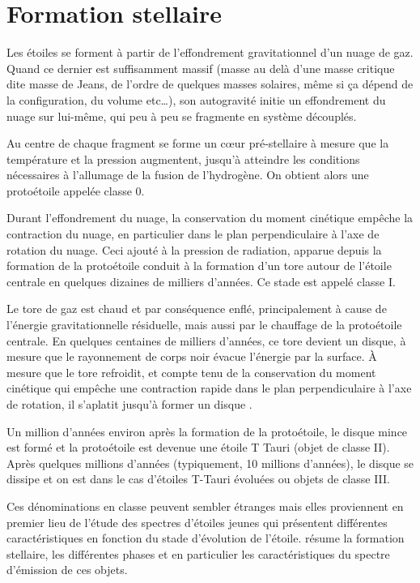 \section{Formation stellaire}
Les étoiles se forment à partir de l'effondrement gravitationnel d'un nuage de gaz. Quand ce dernier est suffisamment massif (masse au delà d'une masse critique dite masse de Jeans, de l'ordre de quelques masses solaires, même si ça dépend de la configuration, du volume etc\dots), son autogravité initie un effondrement du nuage sur lui-même, qui peu à peu se fragmente en système découplés. 

Au centre de chaque fragment se forme un cœur pré-stellaire à mesure que la température et la pression augmentent, jusqu'à atteindre les conditions nécessaires à l'allumage de la fusion de l'hydrogène. On obtient alors une protoétoile appelée \og classe 0\fg. 

Durant l'effondrement du nuage, la conservation du moment cinétique empêche la contraction du nuage, en particulier dans le plan perpendiculaire à l'axe de rotation du nuage. Ceci ajouté à la pression de radiation, apparue depuis la formation de la protoétoile conduit à la formation d'un tore autour de l'étoile centrale en quelques dizaines de milliers d'années. Ce stade est appelé \og classe I\fg.

Le tore de gaz est chaud et par conséquence enflé, principalement à cause de l'énergie gravitationnelle résiduelle, mais aussi par le chauffage de la protoétoile centrale.
En quelques centaines de milliers d'années, ce tore devient un disque, à mesure que le rayonnement de corps noir évacue l'énergie par la surface. À mesure que le tore refroidit, et compte tenu de la conservation du moment cinétique qui empêche une contraction rapide dans le plan perpendiculaire à l'axe de rotation, il s'aplatit jusqu'à former un disque \citep{williams2011protoplanetary}. 

Un million d'années environ après la formation de la protoétoile, le disque mince est formé et la protoétoile est devenue une étoile T Tauri (objet de classe II). Après quelques millions d'années (typiquement, 10 millions d'années), le disque se dissipe et on est dans le cas d'étoiles T-Tauri évoluées ou objets de classe III. 

Ces dénominations en classe peuvent sembler étranges mais elles proviennent en premier lieu de l'étude des spectres d'étoiles jeunes qui présentent différentes caractéristiques en fonction du stade d'évolution de l'étoile.  résume la formation stellaire, les différentes phases et en particulier les caractéristiques du spectre d'émission de ces objets.
 

